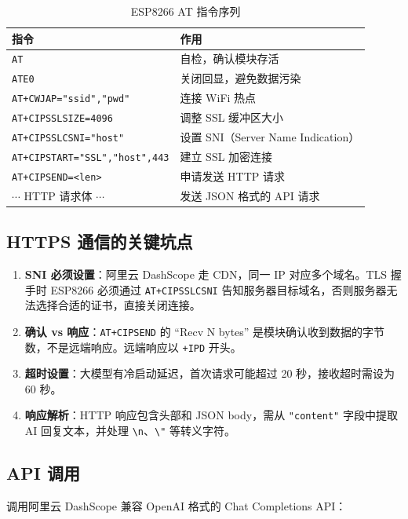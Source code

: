 \documentclass[12pt,a4paper]{ctexart}
\begin{document}
\begin{table}[H]
\centering
\begin{tabularx}{\textwidth}{lX}
\toprule
\textbf{指令} & \textbf{作用} \\
\midrule
\texttt{AT}               & 自检，确认模块存活 \\
\texttt{ATE0}             & 关闭回显，避免数据污染 \\
\texttt{AT+CWJAP="ssid","pwd"} & 连接 WiFi 热点 \\
\texttt{AT+CIPSSLSIZE=4096}    & 调整 SSL 缓冲区大小 \\
\texttt{AT+CIPSSLCSNI="host"}  & 设置 SNI（Server Name Indication） \\
\texttt{AT+CIPSTART="SSL","host",443} & 建立 SSL 加密连接 \\
\texttt{AT+CIPSEND=<len>} & 申请发送 HTTP 请求 \\
$\cdots$ HTTP 请求体 $\cdots$ & 发送 JSON 格式的 API 请求 \\
\bottomrule
\end{tabularx}
\caption{ESP8266 AT 指令序列}
\end{table}

\subsection{HTTPS 通信的关键坑点}

\begin{enumerate}
    \item \textbf{SNI 必须设置}：阿里云 DashScope 走 CDN，同一 IP 对应多个域名。TLS 握手时 ESP8266 必须通过 \texttt{AT+CIPSSLCSNI} 告知服务器目标域名，否则服务器无法选择合适的证书，直接关闭连接。
    \item \textbf{确认 vs 响应}：\texttt{AT+CIPSEND} 的 ``Recv N bytes'' 是模块确认收到数据的字节数，不是远端响应。远端响应以 \texttt{+IPD} 开头。
    \item \textbf{超时设置}：大模型有冷启动延迟，首次请求可能超过 20 秒，接收超时需设为 60 秒。
    \item \textbf{响应解析}：HTTP 响应包含头部和 JSON body，需从 \texttt{"content"} 字段中提取 AI 回复文本，并处理 \texttt{\textbackslash n}、\texttt{\textbackslash "} 等转义字符。
\end{enumerate}

\subsection{API 调用}

调用阿里云 DashScope 兼容 OpenAI 格式的 Chat Completions API：
\end{document}
